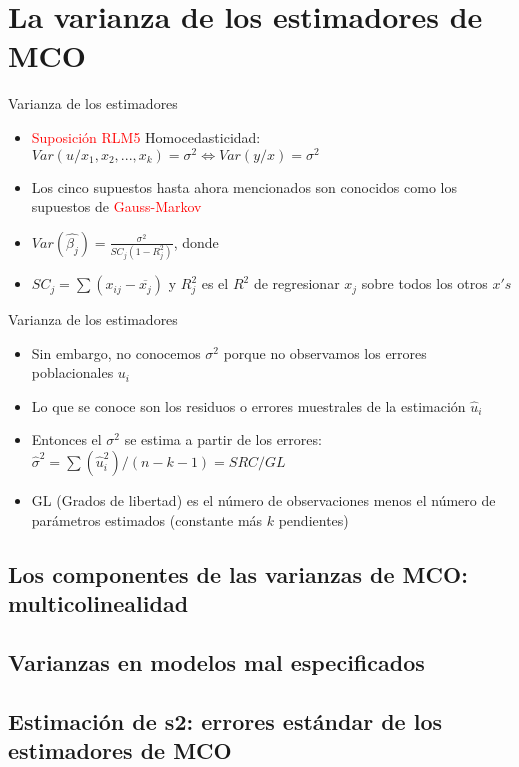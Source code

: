 \section{La varianza de los estimadores de MCO}
\begin{frame}{Varianza de los estimadores}
	\begin{itemize}
		\item \textcolor{red}{Suposición RLM5} Homocedasticidad: $Var(u/x_{1},x_{2},...,x_{k})=\sigma^{2} \Leftrightarrow Var(y/x)=\sigma^{2}$
		
		\item Los cinco supuestos hasta ahora mencionados son conocidos como los supuestos de
		\textcolor{red}{Gauss-Markov}
		
		\item $Var(\hat{\beta_{j}})=\frac{\sigma^{2}}{SC_{j}(1-R_{j}^{2})}$, donde
		\item $SC_{j}=\sum(x_{ij}-\overline{x_{j}})$ y $R_{j}^{2}$ es el $R^{2}$ de regresionar $x_{j}$ sobre todos los otros $x's$
	\end{itemize}
\end{frame}
\begin{frame}{Varianza de los estimadores}
	\begin{itemize}
		\item Sin embargo, no conocemos $\sigma^{2}$ porque no observamos los errores poblacionales $u_{i}$
		\item Lo que se conoce son los residuos o errores muestrales de la estimación $\hat{u}_{i}$
		\item Entonces el $\sigma^{2}$ se estima a partir de los errores:\\ $\hat{\sigma}^{2}=\sum(\hat u_{i}^{2})/(n-k-1)=SRC/GL$
		\item GL (Grados de libertad) es el número de observaciones menos el número de parámetros estimados (constante más $k$ pendientes)
	\end{itemize}
\end{frame}

\subsection{Los componentes de las varianzas de MCO: multicolinealidad}
\subsection{Varianzas en modelos mal especificados}
\subsection{Estimación de s2: errores estándar de los estimadores de MCO}